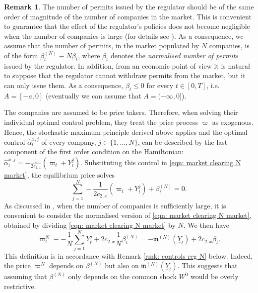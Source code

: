 \documentclass[11pt,twoside]{amsart}
\theoremstyle{definition}
\newtheorem{remark}[theorem]{Remark}
\numberwithin{equation}{section}
\newcommand{\w}{\varpi}
\renewcommand{\hat}{\widehat}
\begin{document}
\begin{remark}
\label{rmk:beta-sign}
The number of permits issued by the regulator should be of the same order of magnitude of the number of companies in the market. This is convenient to guarantee that the effect of the regulator's policies does not become negligible when the number of companies is large (for details see \cite[Remark 3.11]{fujii2022equilibrium}). As a consequence, we assume that the number of permits, in the market populated by $N$ companies, is of the form $\beta^{(N)}_t \equiv N {\beta}_t$, where $\beta_t$ denotes the \emph{normalised number of permits} issued by the regulator. 
In addition, from an economic point of view it is natural to suppose that the regulator cannot withdraw permits from the market, but it can only issue them. As a consequence, $\beta_t\leq0$ for every $t\in[0,T]$, i.e. $A= [-a,0]$ (eventually we can assume that $A = (-\infty, 0]$). 
\end{remark}

The companies are assumed to be price takers. Therefore, when solving their individual optimal control problem, they treat the price process $\w$ as exogenous. Hence, the stochastic maximum principle derived above applies and the optimal control $\hat{\alpha}^{x,j}_t$ of every company, $j \in \{1, \dots, N\}$, can be described by the last component of the first order condition on the Hamiltonian: $\widehat{\alpha}^{x,j}_t= -\frac{1}{2c_{2,x}}(\w_t + Y^j_t)$. Substituting this control in \eqref{eqn: market clearing N market}, the equilibrium price solves
\begin{equation*} 
    \sum_{j = 1}^{N} -\frac{1}{2c_{2,x}}(\w_t + Y^j_t) + \beta^{(N)}_t = 0.
\end{equation*}
As discussed in \cite{follmer1974random}, when the number of companies is sufficiently large, it is convenient to consider the normalised version of \eqref{eqn: market clearing N market}, obtained by dividing \eqref{eqn: market clearing N market} by $N$. We then have 
\begin{equation} 
\label{eqn: eq price process N}
    \w^N_t 
    \equiv -\frac{1}{N}\sum_{j = 1}^{N}Y^j_t + 2c_{2,x}\frac{1}{N}\beta^{(N)}_t 
    = -\mathfrak{m}^{(N)}(\underline{Y}_t) + 2c_{2,x}\beta_t. 
\end{equation}
This definition is in accordance with Remark \ref{rmk: controls reg N} below. Indeed, the price $\w^N$ depends on $\beta^{(N)}$ but also on 
$\mathfrak{m}^{(N)}(\underline{Y}_t)$. 
This suggests that assuming that $\beta^{(N)}$ only depends on the common shock $W^0$ would be overly restrictive. 
\end{document}

